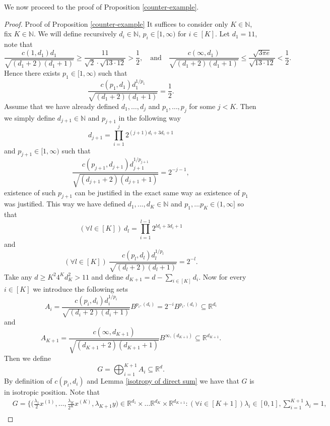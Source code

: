 \documentclass[a4paper,oneside, reqno]{amsart}
\numberwithin{equation}{section}
\theoremstyle{definition}%
\theoremstyle{definition}
\theoremstyle{definition}%
\theoremstyle{definition}
\newcommand{\R}{\mathbb{R}}
\newcommand{\N}{\mathbb{N}}
\begin{document}
\par We now proceed to the proof of Proposition \ref{counter-example}.
\begin{proof}{Proof of Proposition \ref{counter-example}}
It suffices to consider only $K \in \N$,
fix $K \in \N$. We will define recursively $d_i \in \N$, $p_i \in [1, \infty)$ for $i \in [K]$. Let $d_1=11$, note that 
\[
 \frac{c(1,d_1)d_1}{\sqrt{(d_1+2)(d_1+1)}} \ge \frac{11}{\sqrt{2} \cdot \sqrt{13 \cdot 12}}>\frac{1}{2}
 , \quad \text{and} \quad  \frac{ c(\infty, d_1)}{\sqrt{(d_1+2)(d_1+1)}} \le \frac{\sqrt{3 \pi e}}{\sqrt{13 \cdot 12}}<\frac{1}{2}.
\]
Hence there exists $p_1 \in [1, \infty)$ such that 
\[
 \frac{c(p_1,d_1) d_1^{1/p_1}}{\sqrt{(d_1+2)(d_1+1)}}= \frac{1}{2}.
\]
Assume that we have already defined $d_1, \ldots, d_j$ and $p_1, \ldots ,p_j$ for some $j<K$. Then we simply define $d_{j+1} \in \N$ and $p_{j+1}$ in the following way 
\[
 d_{j+1}= \prod_{i=1}^{j} 2^{(j+1)d_i  + 3 d_i+1} 
\]
and $p_{j+1} \in [1, \infty)$ such that 
\[
  \frac{c(p_{j+1},d_{j+1}) d_{j+1}^{1/p_{j+1}}}{\sqrt{(d_{j+1}+2)(d_{j+1}+1)}}= 2^{-j-1},
\]
existence of such $p_{j+1}$ can be justified in the exact same way as existence of $p_1$ was justified.
This way we have defined $d_1,...,d_K \in \N$ and $p_1, \ldots p_K \in (1, \infty]$ so that 
\begin{equation} \label{counter example property 1}
    (\forall l \in [K]) \  d_l =\prod_{i=1}^{l-1} 2^{l d_i  + 3 d_i+1}
\end{equation}
and
\begin{equation} \label{counter example property 2}
    (\forall l \in [K]) \ \frac{ c(p_l,d_l) d_l^{1/p_l}}{\sqrt{(d_l+2)(d_l+1)}}= 2^{-l}.
\end{equation}
Take any $d \ge K^2 4^K d_K^2 >11$ and define $d_{K+1}=d- \sum_{i \in [K]} d_i$.
Now for every $i \in [K]$ we introduce the following sets 
\[
A_i=  \frac{c(p_i,d_i)d_i^{1/p_i}}{\sqrt{(d_i+2)(d_i+1)}}B^{p_i,(d_i)} =2^{-i}B^{p_i,(d_i)} \subseteq \R^{d_i}
\]
and 
\[
A_{K+1}=  \frac{c( \infty, d_{K+1})}{\sqrt{(d_{K+1}+2)(d_{K+1}+1)}} B^{\infty,(d_{K+1})} \subseteq \R^{d_{K+1}}.
\]
Then we define 
\begin{equation} \label{defn of counter example}
    G= \bigoplus_{i=1}^{K+1} A_i \subseteq \R^{d}.
\end{equation}
By definition of $c(p_i,d_i)$ and Lemma \ref{isotropy of direct sum} we have that $G$ is in isotropic position.
Note that 
\begin{align*}
    &G= \Big\{ \Big( \frac{\lambda_1}{2}x^{(1)},\ldots, \frac{\lambda_K}{2^K}x^{(K)}, \lambda_{K+1}y) \in \R^{d_1} \times \ldots \R^{d_K} \times \R^{d_{K+1}}: (\forall i \in [K+1]) \lambda_i \in [0,1],\sum_{i=1}^{K+1} \lambda_i=1, \\

\end{align*}
\end{proof}
\end{document}
